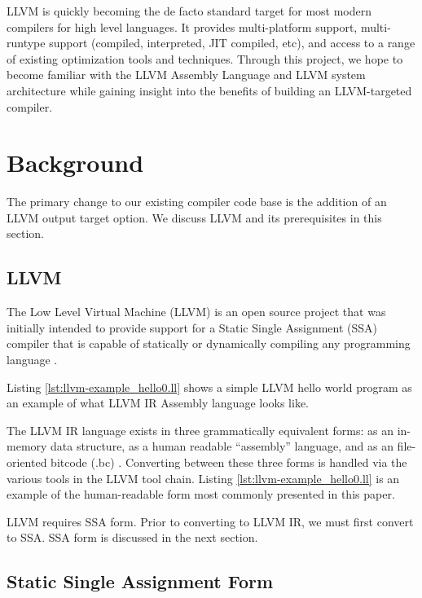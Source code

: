 \documentclass[11pt,twocolumn]{article}
\begin{document}
LLVM is quickly becoming the de facto standard target for most modern
compilers for high level languages.  It provides multi-platform
support, multi-runtype support (compiled, interpreted, JIT compiled,
etc), and access to a range of existing optimization tools and
techniques. Through this project, we hope to become familiar with the
LLVM Assembly Language and LLVM system architecture while gaining
insight into the benefits of building an LLVM-targeted compiler.

\section{Background}

The primary change to our existing compiler code base is the addition
of an LLVM output target option. We discuss LLVM and its prerequisites
in this section.

\subsection{LLVM}

The Low Level Virtual Machine (LLVM) is an open source project that
was initially intended to provide support for a Static Single
Assignment (SSA) compiler that is capable of statically or dynamically
compiling any programming language \cite{llvm.org}.

Listing \ref{lst:llvm-example_hello0.ll} shows
a simple LLVM hello world program as an example of
what LLVM IR Assembly language looks like.



The LLVM IR language exists in three grammatically equivalent forms:
as an in-memory data structure, as a human readable ``assembly''
language, and as an file-oriented bitcode (.bc) \cite{lattner-llvmlangref}.
Converting between these three forms is handled via the various tools
in the LLVM tool chain. Listing \ref{lst:llvm-example_hello0.ll} is an
example of the human-readable form most commonly presented in this
paper.

LLVM requires SSA form. Prior to converting to LLVM IR, we must first
convert to SSA. SSA form is discussed in the next section.

\subsection{Static Single Assignment Form}
\end{document}
